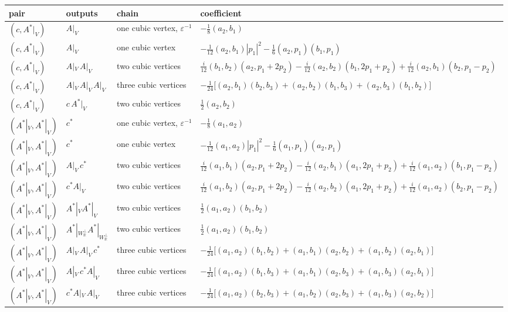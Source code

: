 \begin{tabular}{l|l|l|l}
pair & outputs & chain & coefficient \\
\hline
$(c,A^*|_V)$ & $A|_V$ & one cubic vertex, $\varepsilon^{-1}$ & $-\tfrac18(a_2,b_1)$ \\
$(c,A^*|_V)$ & $A|_V$ & one cubic vertex & $-\tfrac1{12}(a_2,b_1)|p_1|^2-\tfrac16(a_2,p_1)(b_1,p_1)$ \\
$(c,A^*|_V)$ & $A|_V\,A|_V$ & two cubic vertices & $\tfrac i{12}(b_1,b_2)(a_2,p_1+2p_2)-\tfrac i{12}(a_2,b_2)(b_1,2p_1+p_2)+\tfrac i{12}(a_2,b_1)(b_2,p_1-p_2)$ \\
$(c,A^*|_V)$ & $A|_V\,A|_V\,A|_V$ & three cubic vertices & $-\tfrac1{24}\big[(a_2,b_1)(b_2,b_3)+(a_2,b_2)(b_1,b_3)+(a_2,b_3)(b_1,b_2)\big]$ \\
$(c,A^*|_V)$ & $c\,A^*|_V$ & two cubic vertices & $\tfrac12(a_2,b_2)$ \\
$(A^*|_V,A^*|_V)$ & $c^*$ & one cubic vertex, $\varepsilon^{-1}$ & $-\tfrac18(a_1,a_2)$ \\
$(A^*|_V,A^*|_V)$ & $c^*$ & one cubic vertex & $-\tfrac1{12}(a_1,a_2)|p_1|^2-\tfrac16(a_1,p_1)(a_2,p_1)$ \\
$(A^*|_V,A^*|_V)$ & $A|_V\,c^*$ & two cubic vertices & $\tfrac i{12}(a_1,b_1)(a_2,p_1+2p_2)-\tfrac i{12}(a_2,b_1)(a_1,2p_1+p_2)+\tfrac i{12}(a_1,a_2)(b_1,p_1-p_2)$ \\
$(A^*|_V,A^*|_V)$ & $c^*A|_V$ & two cubic vertices & $\tfrac i{12}(a_1,b_2)(a_2,p_1+2p_2)-\tfrac i{12}(a_2,b_2)(a_1,2p_1+p_2)+\tfrac i{12}(a_1,a_2)(b_2,p_1-p_2)$ \\
$(A^*|_V,A^*|_V)$ & $A^*|_VA^*|_V$ & two cubic vertices & $\tfrac12(a_1,a_2)(b_1,b_2)$ \\
$(A^*|_V,A^*|_V)$ & $A^*|_{W_{\mathbb R}^\perp}A^*|_{W_{\mathbb R}^\perp}$ & two cubic vertices & $\tfrac12(a_1,a_2)(b_1,b_2)$ \\
$(A^*|_V,A^*|_V)$ & $A|_V\,A|_V\,c^*$ & three cubic vertices & $-\tfrac1{24}\big[(a_1,a_2)(b_1,b_2)+(a_1,b_1)(a_2,b_2)+(a_1,b_2)(a_2,b_1)\big]$ \\
$(A^*|_V,A^*|_V)$ & $A|_V\,c^*A|_V$ & three cubic vertices & $-\tfrac1{24}\big[(a_1,a_2)(b_1,b_3)+(a_1,b_1)(a_2,b_3)+(a_1,b_3)(a_2,b_1)\big]$ \\
$(A^*|_V,A^*|_V)$ & $c^*A|_V\,A|_V$ & three cubic vertices & $-\tfrac1{24}\big[(a_1,a_2)(b_2,b_3)+(a_1,b_2)(a_2,b_3)+(a_1,b_3)(a_2,b_2)\big]$ \\
\end{tabular}

